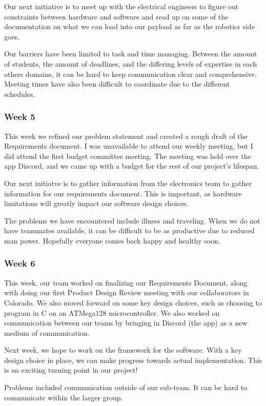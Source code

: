 \documentclass[letterpaper,10pt]{article}
\begin{document}
Our next initiative is to meet up with the electrical engineers to figure out constraints between hardware and 
software and read up on some of the documentation on what we can load into our payload as far as the robotics side 
goes.

Our barriers have been limited to task and time managing. Between the amount of students, the amount of deadlines, and 
the differing levels of expertise in each others domains, it can be hard to keep communication clear and comprehensive.
Meeting times have also been difficult to coordinate due to the different schedules.

\subsubsection{Week 5}
This week we refined our problem statement and created a rough draft of the Requirements document. I was unavailable 
to attend our weekly meeting, but I did attend the first budget committee meeting. The meeting was held over the app 
Discord, and we came up with a budget for the rest of our project's lifespan.

Our next initiatve is to gather information from the electronics team to gather information for our requirements
document. This is important, as hardware limitations will greatly impact our software design choices.

The problems we have encountered include illness and traveling. When we do not have teammates available, it can be
difficult to be as productive due to reduced man power. Hopefully everyone comes back happy and healthy soon.

\subsubsection{Week 6}
This week, our team worked on finalizing our Requirements Document, along with doing our first Product Design Review 
meeting with our collaborators in Colorado. We also moved forward on some key design choices, such as choosing to 
program in C on an ATMega128 microcontroller. We also worked on communication between our teams by bringing in Discord 
(the app) as a new medium of communication.

Next week, we hope to work on the framework for the software. With a key design choice in place, we can make progress
towards actual implementation. This is an exciting turning point in our project!

Problems included communication outside of our sub-team. It can be hard to communicate within the larger group.
\end{document}
